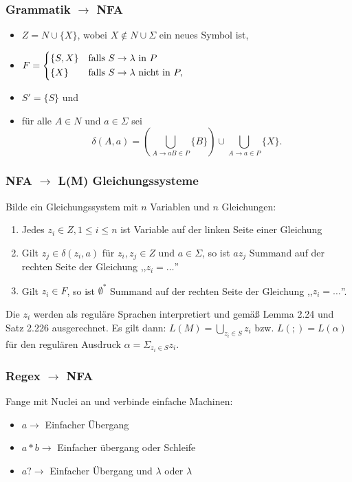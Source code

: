 \documentclass[9pt, a4paper]{article}
\begin{document}
\subsubsection{Grammatik $\to$ NFA}
\begin{itemize}
	\item $Z = N \cup \{X\}$, wobei $X \notin N \cup \Sigma$ ein neues Symbol ist,
	\item
	$F =
	 \begin{dcases}
		\{S, X\} &\text{falls }S \rightarrow \lambda\text{ in }P\\
		\{X\}&\text{falls }S \rightarrow \lambda\text{ nicht in }P,
	\end{dcases} $
	\item $S' = \{S\}$ und
	\item für alle $A \in N$ und $a \in \Sigma$ sei
	$$\delta(A, a) = \left(\bigcup_{A\rightarrow aB \in P} \{B\} \right) \cup \bigcup_{A\rightarrow a \in P} \{X\}.$$
\end{itemize}

\subsubsection{NFA $\to$ L(M) Gleichungssysteme}
Bilde ein Gleichungssystem mit $n$ Variablen und $n$ Gleichungen:
\begin{enumerate}
	\item Jedes $z_i \in Z, 1 \leq i \leq n$ ist Variable auf der linken Seite einer Gleichung
	\item Gilt $z_j \in \delta(z_i, a)$ für $z_i, z_j \in Z$ und $a \in \Sigma$, so ist $az_j$ Summand auf der rechten Seite der Gleichung ,,$z_i = \dots$''
	\item Gilt $z_i \in F$, so ist $\emptyset^*$ Summand auf der rechten Seite der Gleichung ,,$z_i = \dots$''.
\end{enumerate}
Die $z_i$ werden als reguläre Sprachen interpretiert und gemäß Lemma 2.24 und Satz 2.226 ausgerechnet.
Es gilt dann: $L(M) = \bigcup_{z_i \in S}z_i$ bzw. $L(;) = L(\alpha)$ für den regulären Ausdruck $\alpha = \Sigma_{z_i \in S}z_i$.
\subsubsection{Regex $\to$ NFA}
Fange mit Nuclei an und verbinde einfache Machinen:
\begin{itemize}
    \item $a \to $ Einfacher Übergang
    \item $a*b \to $ Einfacher übergang oder Schleife
    \item $a? \to $ Einfacher Übergang und $\lambda$ oder $\lambda$
\end{itemize}
\end{document}
